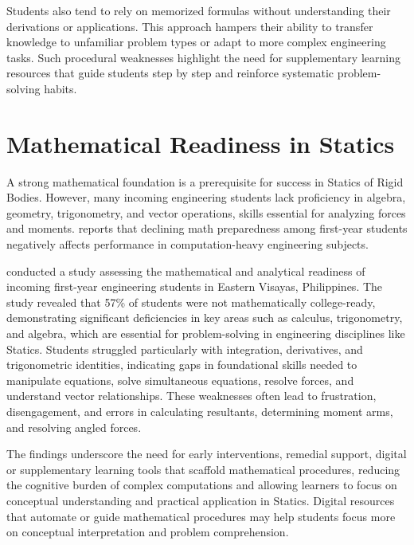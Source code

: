 Students also tend to rely on memorized formulas without understanding their derivations or applications. This approach hampers their ability to transfer knowledge to unfamiliar problem types or adapt to more complex engineering tasks. Such procedural weaknesses highlight the need for supplementary learning resources that guide students step by step and reinforce systematic problem-solving habits.


\section{Mathematical Readiness in Statics}

A strong mathematical foundation is a prerequisite for success in Statics of Rigid Bodies. However, many incoming engineering students lack proficiency in algebra, geometry, trigonometry, and vector operations, skills essential for analyzing forces and moments. \cite{felix_analyzing_2023} reports that declining math preparedness among first-year students negatively affects performance in computation-heavy engineering subjects.

\cite{wenceslao_mathematical_2022} conducted a study assessing the mathematical and analytical readiness of incoming first-year engineering students in Eastern Visayas, Philippines. The study revealed that 57\% of students were not mathematically college-ready, demonstrating significant deficiencies in key areas such as calculus, trigonometry, and algebra, which are essential for problem-solving in engineering disciplines like Statics. Students struggled particularly with integration, derivatives, and trigonometric identities, indicating gaps in foundational skills needed to manipulate equations, solve simultaneous equations, resolve forces, and understand vector relationships. These weaknesses often lead to frustration, disengagement, and errors in calculating resultants, determining moment arms, and resolving angled forces.

The findings underscore the need for early interventions, remedial support, digital or supplementary learning tools that scaffold mathematical procedures, reducing the cognitive burden of complex computations and allowing learners to focus on conceptual understanding and practical application in Statics. Digital resources that automate or guide mathematical procedures may help students focus more on conceptual interpretation and problem comprehension.

